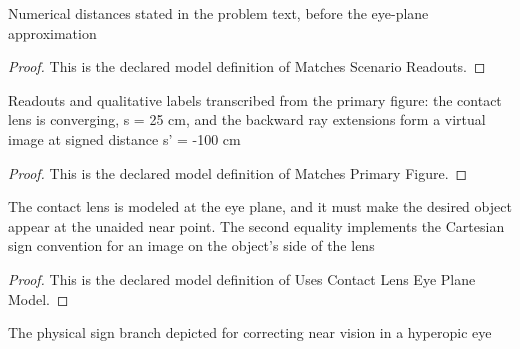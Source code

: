 \begin{definition}
  \label{def:physics:phyx-mini-0044:phyxminiproblems-problemphyxmini0044-matchesscenarioreadouts}
  Numerical distances stated in the problem text, before the eye-plane approximation
\end{definition}
\begin{proof}
  This is the declared model definition of Matches Scenario Readouts.
\end{proof}
\begin{definition}
  \label{def:physics:phyx-mini-0044:phyxminiproblems-problemphyxmini0044-matchesprimaryfigure}
  Readouts and qualitative labels transcribed from the primary figure: the contact lens is converging, s = 25 cm, and the backward ray extensions form a virtual image at signed distance s' = -100 cm
\end{definition}
\begin{proof}
  This is the declared model definition of Matches Primary Figure.
\end{proof}
\begin{definition}
  \label{def:physics:phyx-mini-0044:phyxminiproblems-problemphyxmini0044-usescontactlenseyeplanemodel}
  The contact lens is modeled at the eye plane, and it must make the desired object appear at the unaided near point. The second equality implements the Cartesian sign convention for an image on the object's side of the lens
\end{definition}
\begin{proof}
  This is the declared model definition of Uses Contact Lens Eye Plane Model.
\end{proof}
\begin{definition}
  \label{def:physics:phyx-mini-0044:phyxminiproblems-problemphyxmini0044-hasdepictedsignconfiguration}
  The physical sign branch depicted for correcting near vision in a hyperopic eye
\end{definition}
